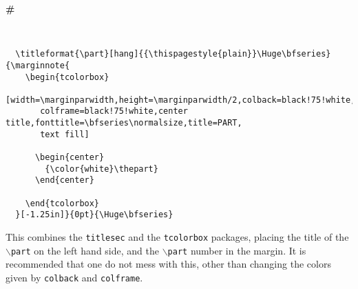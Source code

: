 \begin{fullpage}
{{\centering
  \begin{tcolorbox}[width=\marginparwidth,height=\marginparwidth/2,colback=black!75!white,colframe=black!75!white,center title,fonttitle=\bfseries\normalsize,title=PART,text fill]
    \begin{center}
    {\color{white}\Huge\bfseries\#}
    \end{center}
  \end{tcolorbox}
}}
~ \newline 
\begin{verbatim}
  \titleformat{\part}[hang]{{\thispagestyle{plain}}\Huge\bfseries}{\marginnote{
    \begin{tcolorbox}
    [width=\marginparwidth,height=\marginparwidth/2,colback=black!75!white,
       colframe=black!75!white,center title,fonttitle=\bfseries\normalsize,title=PART,
       text fill]

      \begin{center}
        {\color{white}\thepart}
      \end{center}

    \end{tcolorbox}
  }[-1.25in]}{0pt}{\Huge\bfseries}
\end{verbatim}
\end{fullpage}

This combines the \texttt{titlesec} and the \texttt{tcolorbox} packages, placing the title of the \texttt{$\backslash$part} on the left hand side, and the \texttt{$\backslash$part} number in the margin. It is recommended that one do not mess with this, other than changing the colors given by \texttt{colback} and \texttt{colframe}.
\newpage


